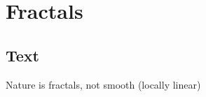\section{Fractals}
\noindent{}
\newpage
\subsection{Text}
Nature is fractals, not smooth (locally linear) 
\newpage
